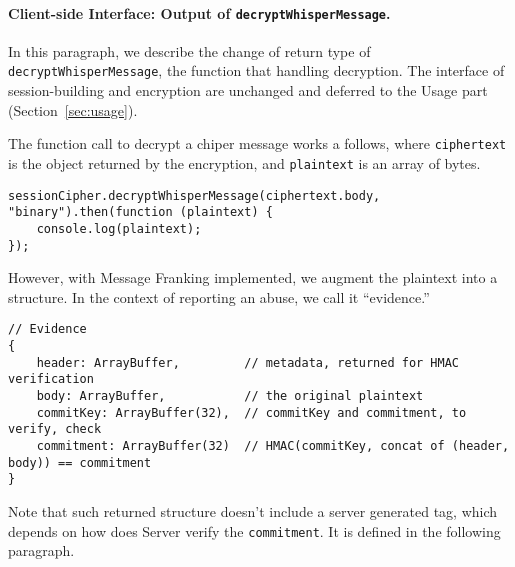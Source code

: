 \documentclass{article}
\begin{document}
\paragraph{Client-side Interface: Output of {\tt decryptWhisperMessage}.}
In this paragraph, 
we describe the change of return type of {\tt decryptWhisperMessage},
the function that handling decryption.
The interface of session-building and encryption are unchanged
and deferred to the Usage part (Section~\ref{sec:usage}).

The function call to decrypt a chiper message works a follows,
where {\tt ciphertext} is the object returned by the encryption,
and {\tt plaintext} is an array of bytes.
{\small
\begin{verbatim}
sessionCipher.decryptWhisperMessage(ciphertext.body, "binary").then(function (plaintext) {
    console.log(plaintext);
});
\end{verbatim}
}
However, with Message Franking implemented,
we augment the plaintext into a structure.
In the context of reporting an abuse, we call it ``evidence.''
{\small
\begin{verbatim}
// Evidence
{
    header: ArrayBuffer,         // metadata, returned for HMAC verification
    body: ArrayBuffer,           // the original plaintext
    commitKey: ArrayBuffer(32),  // commitKey and commitment, to verify, check
    commitment: ArrayBuffer(32)  // HMAC(commitKey, concat of (header, body)) == commitment
}
\end{verbatim}
}
Note that such returned structure doesn't include a server generated tag,
which depends on how does Server verify the {\tt commitment}.
It is defined in the following paragraph.
\end{document}
